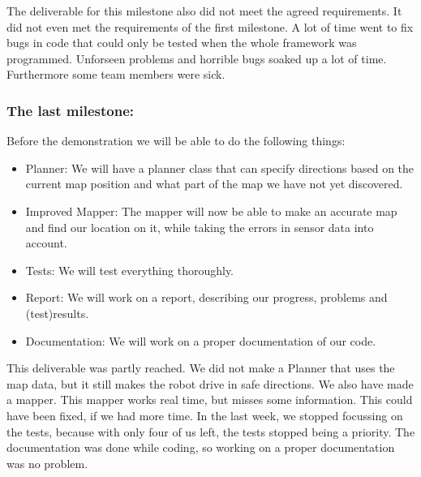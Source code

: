 The deliverable for this milestone also did not meet the agreed requirements. It
did not even met the requirements of the first milestone. A lot of time went to
fix bugs in code that could only be tested when the whole framework was programmed.
Unforseen problems and horrible bugs soaked up a lot of time. Furthermore some
team members were sick.  

\subsubsection*{The last milestone:}
Before the demonstration we will be able to do the following things:
\begin{itemize}
\item Planner: We will have a planner class that can specify directions
based on the current map position and what part of the map we have not yet
discovered.
\item Improved Mapper: The mapper will now be able to make an accurate map
and find our location on it, while taking the errors in sensor data into account.
\item Tests: We will test everything thoroughly.
\item Report: We will work on a report, describing our progress, problems
and (test)results.
\item Documentation: We will work on a proper documentation of our code.
\end{itemize}

This deliverable was partly reached. We did not make a Planner that uses the map
data, but it still makes the robot drive in safe directions.
We also have made a mapper. This mapper works real time, but misses some
information. This could have been fixed, if we had more time.
In the last week, we stopped focussing on the tests, because with only four of
us left, the tests stopped being a priority. The documentation was done while
coding, so working on a proper documentation was no problem. 







